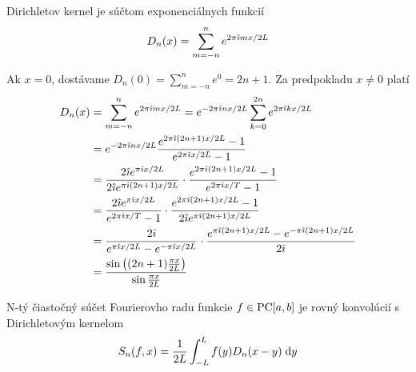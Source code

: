 \begin{lema}
    Dirichletov kernel je súčtom exponenciálnych funkcií
    \begin{equation}
        D_n(x) = \sum_{m=-n}^{n} e^{2 \pi \hat{\imath} m x/2L}
        \label{eq:dirichlet_kernel_alternative}
    \end{equation}
\end{lema}
\begin{dokaz}
    Ak $x=0$, dostávame $D_n(0) = \sum_{m=-n}^{n} e^0 = 2n+1$.
    Za predpokladu $x\not=0$ platí
    \begin{equation*}
    \begin{split}
        D_n(x) &= \sum_{m=-n}^n e^{2 \pi \hat{\imath} m x/2L} 
               = e^{-2 \pi \hat{\imath} n x/2L} \sum_{k=0}^{2n} 
                        e^{2 \pi \hat{\imath} k x/2L} \\
               &= e^{-2 \pi \hat{\imath} n x/2L} 
                \frac{e^{2 \pi \hat{\imath} (2n+1) x /2L}-1}{e^{2 \pi \hat{\imath}
                x/2L}-1} \\
                &= \frac{2 \hat{\imath} e^{\pi\hat{\imath} x/2L}}{
                          2 \hat{\imath} e^{\pi\hat{\imath} (2n+1) x/2L}} \cdot
                \frac{e^{2 \pi \hat{\imath} (2n+1) x /2L}-1}{e^{2 \pi \hat{\imath}
                x/T}-1} \\
                &= \frac{2 \hat{\imath} e^{\pi \hat{\imath} x/2L}}{
                    e^{2 \pi \hat{\imath} x/T}-1} \cdot
                    \frac{e^{2 \pi \hat{\imath} (2n+1) x /2L}-1}{
                        2 \hat{\imath} e^{\pi\hat{\imath} (2n+1) x/2L}}\\
                &= \frac{2 \hat{\imath}}{
                    e^{\pi \hat{\imath} x/2L}-e^{-\pi \hat{\imath} x/2L}} \cdot
                    \frac{e^{\pi \hat{\imath} (2n+1) x /2L}-
                        e^{-\pi \hat{\imath} (2n+1) x /2L}
                    }{2 \hat{\imath}}\\
                &= \frac{\sin\left( (2n+1)\frac{\pi x}{2L} \right)}
                        {\sin \frac{\pi x}{2L}}
    \end{split}
    \end{equation*}
\end{dokaz}

\begin{veta}
    N-tý čiastočný súčet Fourierovho radu funkcie $f \in \mbox{PC}[a,b]$ je
    rovný konvolúcií s Dirichletovým kernelom
    \begin{equation*}
        S_n(f,x) = \frac{1}{2L} \int_{-L}^{L} f(y) D_n(x-y) \; \mathrm{d} y
    \end{equation*}
    \label{veta:dirichlet_expansion}
\end{veta}

